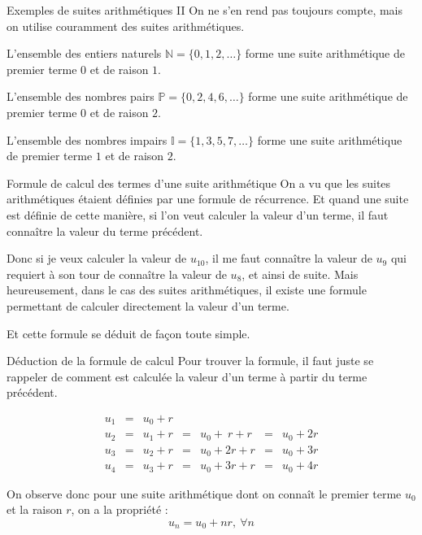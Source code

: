 \documentclass{beamer}
\begin{document}
\begin{frame}{Exemples de suites arithmétiques II}
On ne s'en rend pas toujours compte, mais on utilise couramment des suites arithmétiques.

L'ensemble des entiers naturels $\mathbb{N} = \{0, 1, 2, \dots\}$ forme une suite arithmétique de premier terme $0$ et de raison $1$.

L'ensemble des nombres pairs $\mathbb{P} = \{0, 2, 4, 6, \dots\}$ forme une suite arithmétique de premier terme $0$ et de raison $2$.

L'ensemble des nombres impairs $\mathbb{I} = \{1, 3, 5, 7, \dots\}$ forme une suite arithmétique de premier terme $1$ et de raison $2$.
\end{frame}

\begin{frame}{Formule de calcul des termes d'une suite arithmétique}
On a vu que les suites arithmétiques étaient définies par une formule de récurrence. Et quand une suite est définie de cette manière, si l'on veut calculer la valeur d'un terme, il faut connaître la valeur du terme précédent.

Donc si je veux calculer la valeur de $u_{10}$, il me faut connaître la valeur de $u_9$ qui requiert à son tour de connaître la valeur de $u_8$, et ainsi de suite. Mais heureusement, dans le cas des suites arithmétiques, il existe une formule permettant de calculer directement la valeur d'un terme. \Smiley

Et cette formule se déduit de façon toute simple.
\end{frame}

\begin{frame}{Déduction de la formule de calcul}
Pour trouver la formule, il faut juste se rappeler de comment est calculée la valeur d'un terme  à partir du terme précédent.

\begin{displaymath}
  \begin{array}{lllllll}
    u_1 & = & u_0 + r &   & 				 	    &   &					 \\
    u_2 & = & u_1 + r & = & u_0 + \ r + r & = & u_0 + 2r \\
    u_3 & = & u_2 + r & = & u_0 + 2r  + r & = & u_0 + 3r \\
    u_4 & = & u_3 + r & = & u_0 + 3r  + r & = & u_0 + 4r
  \end{array}
\end{displaymath}

On observe donc pour une suite arithmétique dont on connaît le premier terme $u_0$ et la raison $r$, on a la propriété :
\[
  u_n = u_0 + nr,\ \forall n
\]
\end{frame}
\end{document}
